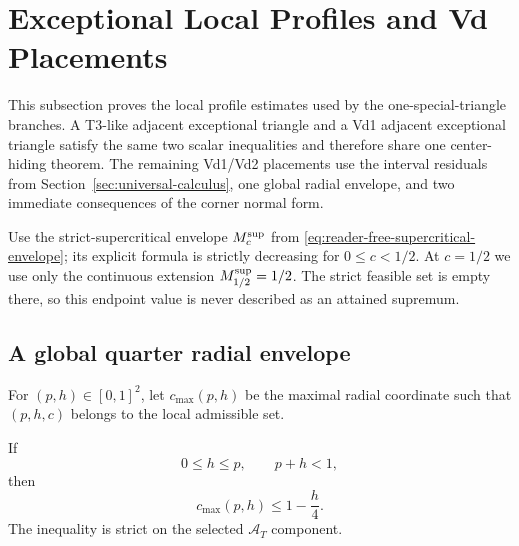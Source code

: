 \section{Exceptional Local Profiles and Vd Placements}
\label{sec:short-vd-placements}

This subsection proves the local profile estimates used by the
one-special-triangle branches.  A T3-like adjacent exceptional triangle and a
Vd1 adjacent exceptional triangle satisfy the same two scalar
inequalities and therefore share one center-hiding theorem.  The remaining
Vd1/Vd2 placements use the interval residuals from
Section~\ref{sec:universal-calculus}, one global radial envelope, and two
immediate consequences of the corner normal form.

Use the strict-supercritical envelope $M_c^{\rm sup}$ from
\eqref{eq:reader-free-supercritical-envelope}; its explicit formula is
strictly decreasing for $0\le c<1/2$.  At $c=1/2$ we use only the continuous
extension $M_{1/2}^{\rm sup}=1/2$.  The strict feasible set is empty there,
so this endpoint value is never described as an attained supremum.

\subsection{A global quarter radial envelope}

For $(p,h)\in[0,1]^2$, let $c_{\max}(p,h)$ be the maximal radial coordinate
such that $(p,h,c)$ belongs to the local admissible set.

\begin{lemma}
\label{lem:quarter-radial-envelope}
If
\[
 0\le h\le p,
 \qquad
 p+h<1,
\]
then
\begin{equation}
 c_{\max}(p,h)\le1-\frac h4.
 \label{eq:quarter-radial-envelope}
\end{equation}
The inequality is strict on the selected $\mathcal A_T$ component.
\end{lemma}

